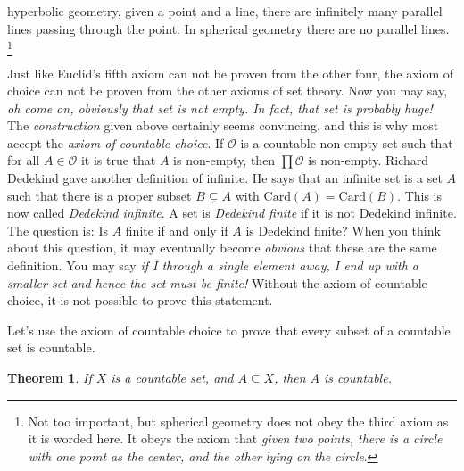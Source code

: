 \documentclass{article}
\theoremstyle{plain}
\newtheorem{theorem}{Theorem}[section]
\theoremstyle{normal}
\newenvironment{axiom}{%
    \pushQED{\qed}\renewcommand{\qedsymbol}{$\blacksquare$}\axiomx%
}{%
    \popQED\endaxiomx%
}
\begin{document}
        hyperbolic geometry, given a point and a line, there are infinitely
        many parallel lines passing through the point. In spherical geometry
        there are no parallel lines.%
        \footnote{%
            Not too important, but spherical geometry does not obey the third
            axiom as it is worded here. It obeys the axiom that
            \textit{given two points, there is a circle with one point as the}
            \textit{center, and the other lying on the circle}.
        }
        \par\hfill\par
        Just like Euclid's fifth axiom can not be proven from the other four,
        the axiom of choice can not be proven from the other axioms of set
        theory. Now you may say, \textit{oh come on, obviously that set is not}
        \textit{empty. In fact, that set is probably huge!} The
        \textit{construction} given above certainly seems convincing, and this
        is why most accept the \textit{axiom of countable choice}.
        \begin{axiom}[\textbf{Axiom of Countable Choice}]
            If $\mathcal{O}$ is a countable non-empty set such that for all
            $A\in\mathcal{O}$ it is true that $A$ is non-empty, then
            $\prod\mathcal{O}$ is non-empty. 
        \end{axiom}
        Richard Dedekind gave another definition of infinite. He says that
        an infinite set is a set $A$ such that there is a proper subset
        $B\subsetneq{A}$ with $\textrm{Card}(A)=\textrm{Card}(B)$. This is
        now called \textit{Dedekind infinite}. A set is
        \textit{Dedekind finite} if it is not Dedekind infinite. The question
        is: Is $A$ finite if and only if $A$ is Dedekind finite? When you
        think about this question, it may eventually become
        \textit{obvious} that these are the same definition. You may say
        \textit{if I through a single element away, I end up with a smaller set}
        \textit{and hence the set must be finite!} Without the axiom of
        countable choice, it is not possible to prove this statement.
        \par\hfill\par
        Let's use the axiom of countable choice to prove that every subset
        of a countable set is countable.
        \begin{theorem}
            If $X$ is a countable set, and $A\subseteq{X}$, then $A$ is
            countable.
        \end{theorem}
\end{document}
